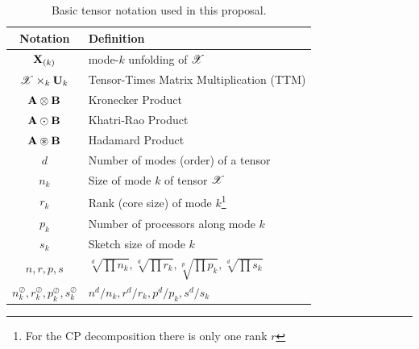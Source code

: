\begin{table}[ht]
  \centering%
  \label{tab:notation}
  \begin{tabular}{cl}
    \toprule
    Notation & Definition \\
    \midrule
    $\M{X}_{(k)}$ & mode-$k$ unfolding of $\T{X}$ \\
    $\T{X}\times_k \M{U}_k$ & Tensor-Times Matrix Multiplication (TTM) \\
    $\M{A}\otimes\M{B}$ & Kronecker Product \\
    $\M{A}\odot\M{B}$ & Khatri-Rao Product \\
    $\M{A}\circledast \M{B}$ & Hadamard Product \\
    \midrule
    $d$ & Number of modes (order) of a tensor \\
    $n_k$ & Size of mode $k$ of tensor $\T{X}$ \\
    $r_k$ & Rank (core size) of mode $k$\footnote{For the CP decomposition there is only one rank $r$} \\
    $p_k$ & Number of processors along mode $k$ \\
    $s_k$ & Sketch size of mode $k$ \\
    $n,r,p,s$ & $\sqrt[d]{\prod n_k}, \sqrt[d]{\prod r_k}, \sqrt[p]{\prod p_k}, \sqrt[d]{\prod s_k}$ \\
    $n_k^\oslash,r_k^\oslash,p_k^\oslash,s_k^\oslash$ & $n^d/n_k,r^d/r_k,p^d/p_k,s^d/s_k$ \\
    \bottomrule
  \end{tabular}
  \caption{Basic tensor notation used in this proposal.}
\end{table}
%
